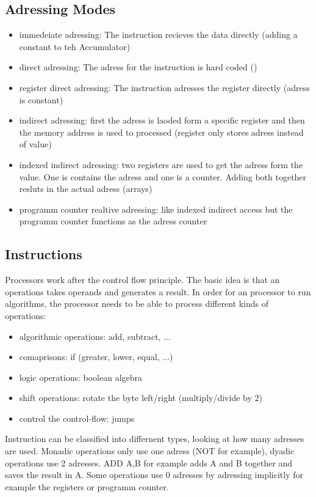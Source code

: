 \documentclass[a4paper]{scrartcl}
\begin{document}
            \subsection*{Adressing Modes}
            \begin{itemize}
                \item immedeiate adressing: The instruction recieves the data directly (adding a constant to teh Accumulator)
                \item direct adressing: The adress for the instruction is hard coded () 
                \item register direct adressing: The instruction adresses the register directly (adress is constant) 
                \item indirect adressing: first the adress is laoded form a specific register and then the memory address is used to processed (register only stores adress instead of value)
                \item indexed indirect adressing: two registers are used to get the adress form the value. One is contains the adress and one is a counter. Adding both together resluts in the actual adress (arrays)
                \item programm counter realtive adressing: like indexed indirect access but the programm counter functions as the adress counter
            \end{itemize}

        \subsection{Instructions}
            Processors work after the control flow principle. The basic idea is that an operations takes operands and generates a result. In order for an processor to run 
            algorithms, the processor needs to be able to process different kinds of operations:
            \begin{itemize}
                \item algorithmic operations: add, subtract, ...
                \item comaprisons: if (greater, lower, equal, ...)
                \item logic operations: boolean algebra
                \item shift operations: rotate the byte left/right (multiply/divide by 2)
                \item control the control-flow: jumps
            \end{itemize}
            Instruction can be classified into differnent types, looking at how many adresses are used. Monadic operations only use one adress (NOT for example), dyadic 
            operations use 2 adresses. ADD A,B for example adds A and B together and saves the result in A. Some operations use 0 adresses by adressing implicitly for example the 
            registers or programm counter. 
\end{document}
